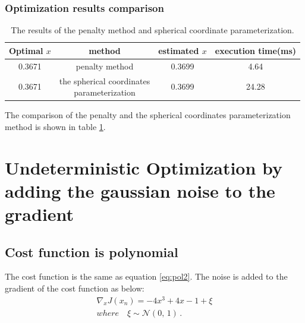 \documentclass[a4paper,12pt]{article}
\begin{document}
\subsubsection{Optimization results comparison}


\begin{table}[!ht]
\begin{center}
\begin{tabular}{|c|c|c|c|}
\hline
Optimal $x$& method & estimated $x$&execution time(ms)\\
\hline
0.3671& penalty method&0.3699&4.64\\
\hline
0.3671&  \makecell{ the spherical coordinates \\parameterization}&0.3699&24.28\\

\hline
\end{tabular}
\end{center}
\caption{The results of the penalty method and spherical coordinate parameterization.}
\label{tab:exp}
\end{table}


The comparison of the penalty and the spherical coordinates parameterization method is shown in table \ref{tab:exp}. \\
\section{Undeterministic Optimization by adding the gaussian noise to the gradient}
\subsection{Cost function is polynomial }
The cost function is the same as equation \ref{eq:pol2}. The noise is added to the gradient of the cost function as below:\\
\begin{equation}\label{eq:pena_poly_noise}
\begin{aligned}
\nabla _x J(x_n) = -4x^3+4x-1+\xi\\
where \quad \xi \sim \mathcal{N}(0,\,1)\,.\\
\end{aligned}
\end{equation}



  
 
\end{document}

